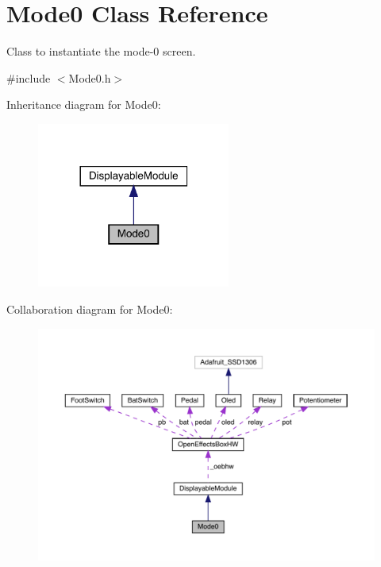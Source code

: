 \hypertarget{class_mode0}{}\section{Mode0 Class Reference}
\label{class_mode0}


Class to instantiate the mode-\/0 screen.  




{\ttfamily \#include $<$Mode0.\+h$>$}



Inheritance diagram for Mode0\+:
\nopagebreak
\begin{figure}[H]
\begin{center}
\leavevmode
\includegraphics[width=180pt]{class_mode0__inherit__graph}
\end{center}
\end{figure}


Collaboration diagram for Mode0\+:
\nopagebreak
\begin{figure}[H]
\begin{center}
\leavevmode
\includegraphics[width=350pt]{class_mode0__coll__graph}
\end{center}
\end{figure}
